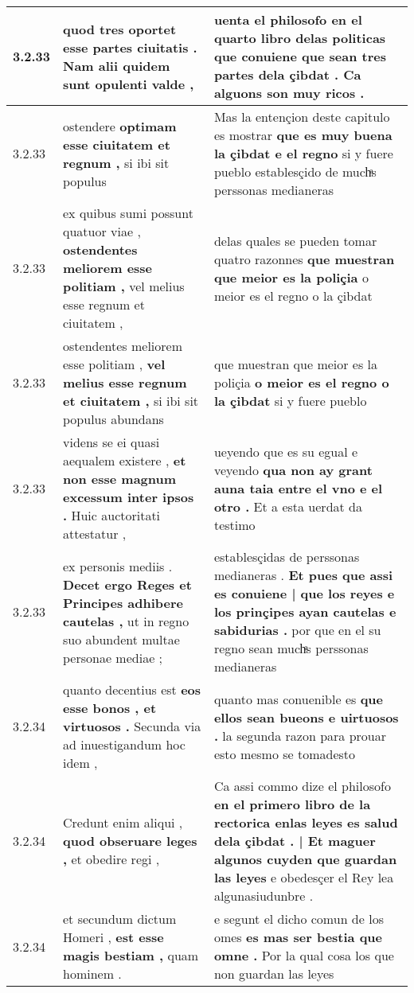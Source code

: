 \begin{tabular}{|p{1cm}|p{6.5cm}|p{6.5cm}|}
3.2.33 & quod tres oportet \textbf{ esse partes ciuitatis . } Nam alii quidem sunt opulenti valde , & uenta el philosofo en el quarto libro delas politicas \textbf{ que conuiene que sean tres partes dela çibdat . } Ca alguons son muy ricos . \\\hline
3.2.33 & ostendere \textbf{ optimam esse ciuitatem et regnum , } si ibi sit populus & Mas la entençion deste capitulo es mostrar \textbf{ que es muy buena la çibdat e el regno } si y fuere pueblo establesçido de muchͣs perssonas medianeras \\\hline
3.2.33 & ex quibus sumi possunt quatuor viae , \textbf{ ostendentes meliorem esse politiam , } vel melius esse regnum et ciuitatem , & delas quales se pueden tomar quatro razonnes \textbf{ que muestran que meior es la poliçia } o meior es el regno o la çibdat \\\hline
3.2.33 & ostendentes meliorem esse politiam , \textbf{ vel melius esse regnum et ciuitatem , } si ibi sit populus abundans & que muestran que meior es la poliçia \textbf{ o meior es el regno o la çibdat } si y fuere pueblo \\\hline
3.2.33 & videns se ei quasi aequalem existere , \textbf{ et non esse magnum excessum inter ipsos . } Huic auctoritati attestatur , & ueyendo que es su egual e veyendo \textbf{ qua non ay grant auna taia entre el vno e el otro . } Et a esta uerdat da testimo \\\hline
3.2.33 & ex personis mediis . \textbf{ Decet ergo Reges et Principes adhibere cautelas , } ut in regno suo abundent multae personae mediae ; & establesçidas de perssonas medianeras . \textbf{ Et pues que assi es conuiene | que los reyes e los prinçipes ayan cautelas e sabidurias . } por que en el su regno sean muchͣs perssonas medianeras \\\hline
3.2.34 & quanto decentius est \textbf{ eos esse bonos , et virtuosos . } Secunda via ad inuestigandum hoc idem , & quanto mas conuenible es \textbf{ que ellos sean bueons e uirtuosos . } la segunda razon para prouar esto mesmo se tomadesto \\\hline
3.2.34 & Credunt enim aliqui , \textbf{ quod obseruare leges , } et obedire regi , & Ca assi commo dize el philosofo \textbf{ en el primero libro de la rectorica enlas leyes es salud dela çibdat . | Et maguer algunos cuyden que guardan las leyes } e obedesçer el Rey lea algunasiudunbre . \\\hline
3.2.34 & et secundum dictum Homeri , \textbf{ est esse magis bestiam , } quam hominem . & e segunt el dicho comun de los omes \textbf{ es mas ser bestia que omne . } Por la qual cosa los que non guardan las leyes \\\hline

\end{tabular}
